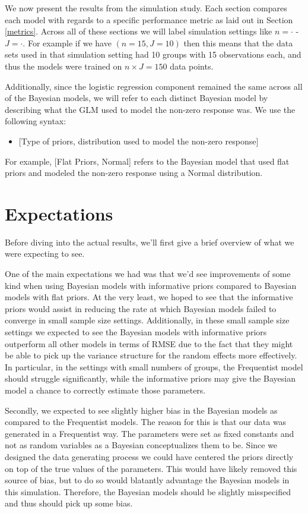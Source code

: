 \documentclass[12pt,twoside]{reedthesis}
\providecommand{\tightlist}{%
  \setlength{\itemsep}{0pt}\setlength{\parskip}{0pt}}
\begin{document}
We now present the results from the simulation study. Each section compares each model with regards to a specific performance metric as laid out in Section \ref{metrics}. Across all of these sections we will label simulation settings like \(n = \cdot\) - \(J = \cdot\). For example if we have \((n = 15, J = 10 )\) then this means that the data sets used in that simulation setting had 10 groups with 15 observations each, and thus the models were trained on \(n\times J = 150\) data points.

Additionally, since the logistic regression component remained the same across all of the Bayesian models, we will refer to each distinct Bayesian model by describing what the GLM used to model the non-zero response was. We use the following syntax:
\begin{itemize}
\tightlist
\item
  {[}Type of priors, distribution used to model the non-zero response{]}
\end{itemize}
For example, {[}Flat Priors, Normal{]} refers to the Bayesian model that used flat priors and modeled the non-zero response using a Normal distribution.

\hypertarget{expectations}{%
\section{Expectations}\label{expectations}}

Before diving into the actual results, we'll first give a brief overview of what we were expecting to see.

One of the main expectations we had was that we'd see improvements of some kind when using Bayesian models with informative priors compared to Bayesian models with flat priors. At the very least, we hoped to see that the informative priors would assist in reducing the rate at which Bayesian models failed to converge in small sample size settings. Additionally, in these small sample size settings we expected to see the Bayesian models with informative priors outperform all other models in terms of RMSE due to the fact that they might be able to pick up the variance structure for the random effects more effectively. In particular, in the settings with small numbers of groups, the Frequentist model should struggle significantly, while the informative priors may give the Bayesian model a chance to correctly estimate those parameters.

Secondly, we expected to see slightly higher bias in the Bayesian models as compared to the Frequentist models. The reason for this is that our data was generated in a Frequentist way. The parameters were set as fixed constants and not as random variables as a Bayesian conceptualizes them to be. Since we designed the data generating process we could have centered the priors directly on top of the true values of the parameters. This would have likely removed this source of bias, but to do so would blatantly advantage the Bayesian models in this simulation. Therefore, the Bayesian models should be slightly misspecified and thus should pick up some bias.
\end{document}
